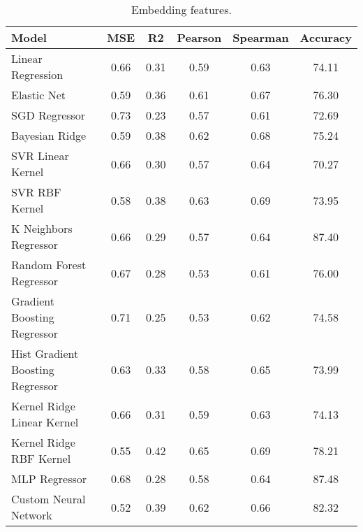 \begin{table}[ht]
    \begin{subtable}[t]{\textwidth}
        \centering
        \begin{tabular}{|l|c|c|c|c|c|}
            \hline
            Model & MSE & R2 & Pearson & Spearman & Accuracy \\
            \hline
            Linear Regression & 0.66 & 0.31 & 0.59 & 0.63 & 74.11 \\
            Elastic Net & 0.59 & 0.36 & 0.61 & 0.67 & 76.30 \\
            SGD Regressor & 0.73 & 0.23 & 0.57 & 0.61 & 72.69 \\
            Bayesian Ridge & 0.59 & 0.38 & 0.62 & 0.68 & 75.24 \\
            SVR Linear Kernel & 0.66 & 0.30 & 0.57 & 0.64 & 70.27 \\
            SVR RBF Kernel & 0.58 & 0.38 & 0.63 & 0.69 & 73.95 \\
            K Neighbors Regressor & 0.66 & 0.29 & 0.57 & 0.64 & 87.40 \\
            Random Forest Regressor & 0.67 & 0.28 & 0.53 & 0.61 & 76.00 \\
            Gradient Boosting Regressor & 0.71 & 0.25 & 0.53 & 0.62 & 74.58 \\
            Hist Gradient Boosting Regressor & 0.63 & 0.33 & 0.58 & 0.65 & 73.99 \\
            Kernel Ridge Linear Kernel & 0.66 & 0.31 & 0.59 & 0.63 & 74.13 \\
            Kernel Ridge RBF Kernel & 0.55 & 0.42 & 0.65 & 0.69 & 78.21 \\
            MLP Regressor & 0.68 & 0.28 & 0.58 & 0.64 & 87.48 \\
            Custom Neural Network & 0.52 & 0.39 & 0.62 & 0.66 & 82.32 \\
            \hline
        \end{tabular}
        \caption{Embedding features.}
        \label{tab:simple_models_results_embeddings}
    \end{subtable}    


\end{table}
